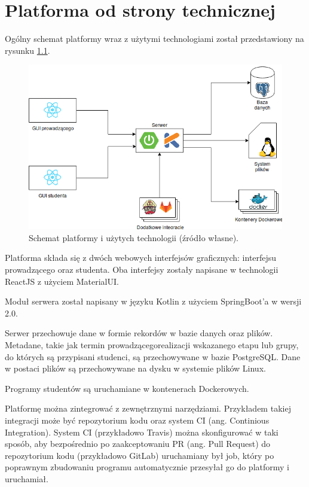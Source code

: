 \chapter{Platforma od strony technicznej}
\label{chapter:platform-technical}
Ogólny schemat platformy wraz z użytymi technologiami został przedstawiony na rysunku \ref{fig:platform-schema}.

\begin{figure}[h]
    \centering
    \includegraphics[width = 13cm]{chapter02/platform_schema.png}
    \caption{Schemat platformy i użytych technologii (źródło własne).}
    \label{fig:platform-schema}
\end{figure}

Platforma składa się z dwóch webowych interfejsów graficznych: interfejsu prowadzącego oraz studenta.
Oba interfejsy zostały napisane w technologii ReactJS z użyciem MaterialUI.

Moduł serwera został napisany w języku Kotlin z użyciem SpringBoot’a w wersji 2.0.

Serwer przechowuje dane w formie rekordów w bazie danych oraz plików.
Metadane, takie jak termin prowadzącegorealizacji wskazanego etapu lub grupy, do których są przypisani studenci, są przechowywane w bazie PostgreSQL.
Dane w postaci plików są przechowywane na dysku w systemie plików Linux.

Programy studentów są uruchamiane w kontenerach Dockerowych.

Platformę można zintegrować z zewnętrznymi narzędziami.
Przykładem takiej integracji może być repozytorium kodu oraz system CI (ang. Continious Integration).
System CI (przykładowo Travis) można skonfigurować w taki sposób, aby bezpośrednio po zaakceptowaniu PR (ang. Pull Request) do repozytorium kodu (przykładowo GitLab) uruchamiany był job, który po poprawnym zbudowaniu programu automatycznie przesyłał go do platformy i uruchamiał.

